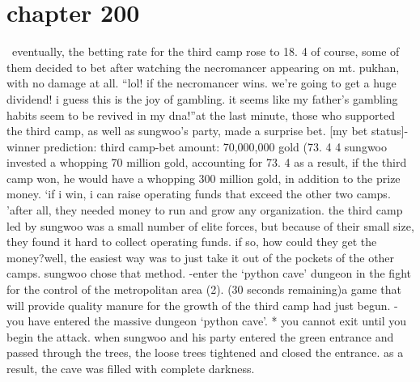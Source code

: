 \section{chapter 200}






 eventually, the betting rate for the third camp rose to 18.
4%
of course, some of them decided to bet after watching the necromancer appearing on mt.
 pukhan, with no damage at all.
“lol! if the necromancer wins.
 we’re going to get a huge dividend! i guess this is the joy of gambling.
 it seems like my father’s gambling habits seem to be revived in my dna!”at the last minute, those who supported the third camp, as well as sungwoo’s party, made a surprise bet.
[my bet status]-winner prediction: third camp-bet amount: 70,000,000 gold (73.
4%
4%
sungwoo invested a whopping 70 million gold, accounting for 73.
4%
 as a result, if the third camp won, he would have a whopping 300 million gold, in addition to the prize money.
‘if i win, i can raise operating funds that exceed the other two camps.
’after all, they needed money to run and grow any organization.
the third camp led by sungwoo was a small number of elite forces, but because of their small size, they found it hard to collect operating funds.
if so, how could they get the money?well, the easiest way was to just take it out of the pockets of the other camps.
sungwoo chose that method.
-enter the ‘python cave’ dungeon in the fight for the control of the metropolitan area (2).
 (30 seconds remaining)a game that will provide quality manure for the growth of the third camp had just begun.
-you have entered the massive dungeon ‘python cave’.
* you cannot exit until you begin the attack.
when sungwoo and his party entered the green entrance and passed through the trees, the loose trees tightened and closed the entrance.
as a result, the cave was filled with complete darkness.

